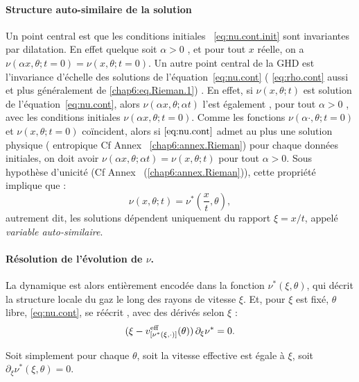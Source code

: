 \paragraph{Structure auto-similaire de la solution}
Un point central est que les conditions initiales ~\eqref{eq:nu.cont.init} sont invariantes par dilatation. En effet quelque soit $\alpha >0$ , et pour tout $x$ réelle, on a $\nu(\alpha x , \theta ; t = 0 ) = \nu( x , \theta ; t = 0 ) $.
Un autre point central de la GHD est l’invariance d’échelle des solutions de l’équation~\eqref{eq:nu.cont} ( \eqref{eq:rho.cont} aussi et plus généralement de \eqref{chap6:eq.Rieman.1}) . En effet, si $\nu(x,\theta;t)$ est solution de  l’équation~\eqref{eq:nu.cont}, alors $\nu(\alpha x, \theta; \alpha t)$ l’est également ,  pour tout $\alpha > 0$ , avec les conditions initiales $\nu(\alpha x , \theta ; t = 0 )$. {\color{blue} Comme les fonctions $\nu(\alpha \cdot , \theta ; t = 0 )$ et $\nu( x , \theta ; t = 0 )$ coïncident, alors si $\eqref{eq:nu.cont}$ admet au plus une solution physique ( entropique Cf Annex ~\ref{chap6:annex.Rieman}) pour chaque données initiales, on doit avoir $\nu( \alpha x , \theta ; \alpha t ) = \nu(  x , \theta ;  t )$ pour tout $\alpha > 0 $}. Sous hypothèse d’unicité (Cf Annex ~(\ref{chap6:annex.Rieman})), cette propriété implique que :
\begin{equation}
    \nu(x,\theta;t) = \nu^*\left(\frac{x}{t},\theta\right),
    \label{eq:nuvsnuetoile}
\end{equation}
autrement dit, les solutions dépendent uniquement du rapport $\xi = x/t$, appelé \emph{variable auto-similaire}. 


\paragraph{Résolution de l'évolution de $\nu$.} La dynamique est alors entièrement encodée dans la fonction $\nu^*(\xi,\theta)$, qui décrit la structure locale du gaz le long des rayons de vitesse $\xi$. Et,  pour $\xi$ est fixé, $\theta$  libre, \eqref{eq:nu.cont},  se réécrit  , avec des dérivés selon $\xi$ : 
\begin{equation}
	( \xi - v^{\rm eff}_{[\nu^\ast(\xi,\cdot )  ]}(\theta) )\, \partial_\xi \nu^\ast  = 0 .	
\end{equation}

Soit simplement pour chaque $\theta$, soit la vitesse effective est égale à $\xi$, soit $\partial_\xi \nu^\ast(\xi,\theta) = 0$.


